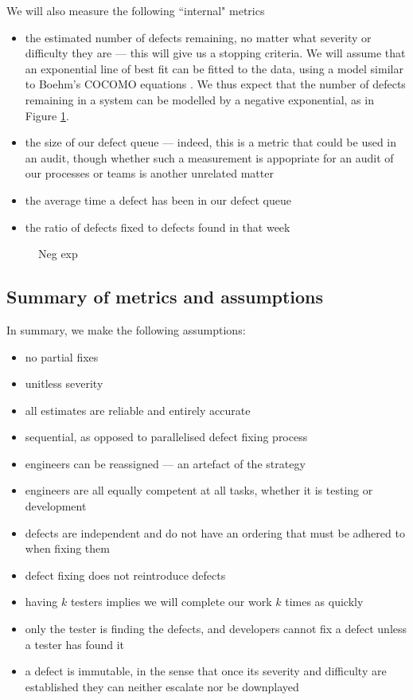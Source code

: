 We will also measure the following ``internal" metrics
\begin{itemize}
	\item the estimated number of defects remaining, no matter what severity or difficulty they are
--- this will give us a stopping criteria.
	We will assume that an exponential line of best fit can be fitted to the data, using a model
similar to Boehm's COCOMO equations \FIXME.
	We thus expect that the number of defects remaining in a system can be modelled by a negative
exponential, as in Figure \ref{negExp}.
	\item the size of our defect queue --- indeed, this is a metric that could be used in an audit,
though whether such a measurement is appopriate for an audit of our processes or teams is another
unrelated matter
	\item the average time a defect has been in our defect queue
	\item the ratio of defects fixed to defects found in that week
\end{itemize}

\begin{figure}[ht!]
	\caption{Neg exp \FIXME} \label{negExp}
\end{figure}

\subsection{Summary of metrics and assumptions}

In summary, we make the following assumptions:
\begin{itemize}
	\item no partial fixes
	\item unitless severity
	\item all estimates are reliable and entirely accurate
	\item sequential, as opposed to parallelised defect fixing process
	\item engineers can be reassigned --- an artefact of the strategy
	\item engineers are all equally competent at all tasks, whether it is testing or development
	\item defects are independent and do not have an ordering that must be adhered to when fixing them
	\item defect fixing does not reintroduce defects
	\item having $k$ testers implies we will complete our work $k$ times as quickly
	\item only the tester is finding the defects, and developers cannot fix a defect unless a tester
has found it
	\item a defect is immutable, in the sense that once its severity and difficulty are established
they can neither escalate nor be downplayed
\end{itemize}

